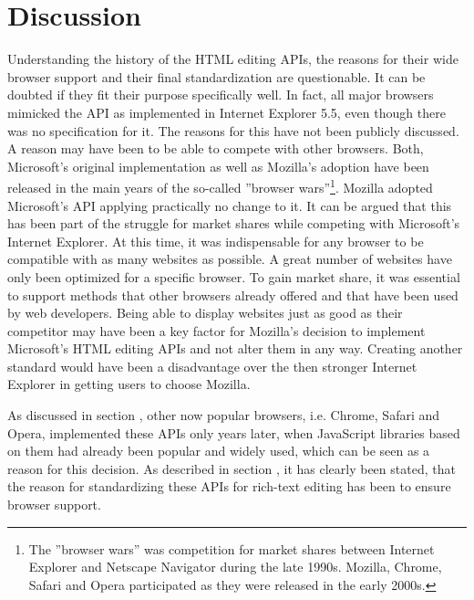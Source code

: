 
\section{Discussion}

Understanding the history of the HTML editing APIs, the reasons for their wide browser support and their final standardization are questionable. It can be doubted if they fit their purpose specifically well. In fact, all major browsers mimicked the API as implemented in Internet Explorer 5.5, even though there was no specification for it. The reasons for this have not been publicly discussed. A reason may have been to be able to compete with other browsers. Both, Microsoft's original implementation as well as Mozilla's adoption have been released in the main years of the so-called ''browser wars''\footnote{The ''browser wars'' was competition for market shares between Internet Explorer and Netscape Navigator during the late 1990s. Mozilla, Chrome, Safari and Opera participated as they were released in the early 2000s.}. Mozilla adopted Microsoft's API applying practically no change to it. It can be argued that this has been part of the struggle for market shares while competing with Microsoft's Internet Explorer. At this time, it was indispensable for any browser to be compatible with as many websites as possible. A great number of websites have only been optimized for a specific browser. To gain market share, it was essential to support methods that other browsers already offered and that have been used by web developers. Being able to display websites just as good as their competitor may have been a key factor for Mozilla's decision to implement Microsoft's HTML editing APIs and not alter them in any way. Creating another standard would have been a disadvantage over the then stronger Internet Explorer in getting users to choose Mozilla. 

As discussed in section , other now popular browsers, i.e. Chrome, Safari and Opera, implemented these APIs only years later, when JavaScript libraries based on them had already been popular and widely used, which can be seen as a reason for this decision. As described in section , it has clearly been stated, that the reason for standardizing these APIs for rich-text editing has been to ensure browser support.

